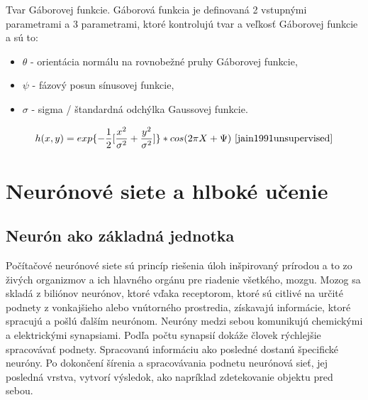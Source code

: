 \hspace{10mm}Tvar Gáborovej funkcie. Gáborová funkcia je definovaná 2 vstupnými parametrami a 3 parametrami, ktoré kontrolujú tvar a veľkosť Gáborovej funkcie a sú to:
\begin{itemize}
    \item \(\theta\) - orientácia normálu na rovnobežné pruhy Gáborovej funkcie,
    \item \(\psi\) - fázový posun sínusovej funkcie,
    \item \(\sigma\) - sigma / štandardná odchýlka Gaussovej funkcie.
\end{itemize}

\[h(x,y) = exp\{-\frac{1}{2}[\frac{x^2}{\sigma^2} + \frac{y^2}{\sigma^2}]\} * cos(2\pi X + \Psi)\ \cite{jain1991unsupervised}\]


\section{Neurónové siete a hlboké učenie}

\subsection{Neurón ako základná jednotka}

\hspace{10mm}Počítačové neurónové siete sú princíp riešenia úloh inšpirovaný prírodou a to zo živých organizmov a ich hlavného orgánu pre riadenie všetkého, mozgu. Mozog sa skladá z biliónov neurónov, ktoré vďaka receptorom, ktoré sú citlivé na určité podnety z vonkajšieho alebo vnútorného prostredia, získavajú informácie, ktoré spracujú a pošlú ďalším neurónom. Neuróny medzi sebou komunikujú  chemickými a elektrickými synapsiami. Podľa počtu synapsií dokáže človek rýchlejšie spracovávať podnety. Spracovanú informáciu ako posledné dostanú špecifické neuróny. Po dokončení šírenia a spracovávania podnetu neurónová sieť, jej posledná vrstva, vytvorí výsledok, ako napríklad zdetekovanie objektu pred sebou.


